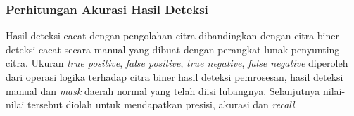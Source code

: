 \documentclass[laporan.tex]{subfiles}
\begin{document}
\subsubsection{Perhitungan Akurasi Hasil Deteksi}

Hasil deteksi cacat dengan pengolahan citra dibandingkan dengan citra biner deteksi cacat secara manual yang dibuat dengan perangkat lunak penyunting citra. Ukuran \emph{true positive}, \emph{false positive}, \emph{true negative}, \emph{false negative} diperoleh dari operasi logika terhadap citra biner hasil deteksi pemrosesan, hasil deteksi manual dan \emph{mask} daerah normal yang telah diisi lubangnya. Selanjutnya nilai-nilai tersebut diolah untuk mendapatkan presisi, akurasi dan \emph{recall}.
\end{document}
